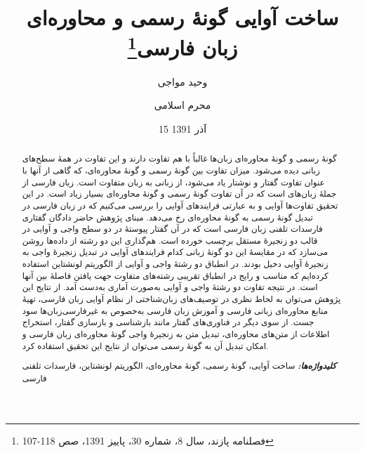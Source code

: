 \documentclass[12pt,onecolumn,a4paper]{article}
\providecommand{\keywords}[1]{\textbf{\textit{کلیدواژه‌ها:}} #1}
\begin{document}
    \title{ساخت آوایی گونهٔ رسمی و محاوره‌ای زبان فارسی\footnote{فصلنامه پازند، سال 8، شماره 30، پاییز 1391، صص 118-107}}
    \author[1]{وحید مواجی}
    \author[2]{محرم اسلامی}
    \date{15 آذر 1391}
    \maketitle

    \begin{abstract}
        گونهٔ رسمی و گونهٔ محاوره‌ای زبان‌ها غالباً با هم تفاوت‌ دارند و این تفاوت در همهٔ سطح‌های زبانی دیده می‌شود. میزان تفاوت بین گونهٔ رسمی و گونهٔ محاوره‌ای، که گاهی از آنها با عنوان تفاوت گفتار و نوشتار یاد می‌شود، از زبانی به زبان متفاوت است. زبان فارسی از جملهٔ زبان‌های است که در آن تفاوت گونهٔ رسمی و گونهٔ محاوره‌ای بسیار زیاد است. در این تحقیق تفاوت‌ها آوایی و به عبارتی فرایندهای آوایی را بررسی می‌کنیم که در زبان فارسی در تبدیل گونهٔ رسمی به گونهٔ محاوره‌ای رخ می‌دهد. مبنای پژوهش حاضر دادگان گفتاری فارسدات تلفنی زبان فارسی است که در آن گفتار پیوستهٔ در دو سطح واجی و آوایی در قالب دو زنجیرهٔ مستقل برچسب خورده است. هم‌گذاری این دو رشته از داده‌ها روشن می‌سازد که در مقایسهٔ این دو گونهٔ زبانی کدام فرایندهای آوایی در تبدیل زنجیرهٔ واجی به زنجیرهٔ آوایی دخیل بودند. در انطباق دو رشتهٔ واجی و آوایی از الگوریتم لونشتاین استفاده کرده‌ایم که مناسب و رایج در انطباق تقریبی رشته‌های متفاوت جهت یافتن فاصلهٔ بین آنها است. در نتیجه تفاوت دو رشتهٔ واجی و آوایی به‌صورت آماری به‌دست آمد. از نتایج این پژوهش می‌توان به لحاظ نظری در توصیف‌های زبان‌شناختی از نظام آوایی زبان فارسی، تهیهٔ منابع محاوره‌ای زبانی فارسی و آموزش زبان فارسی به‌خصوص به غیرفارسی‌زبان‌ها سود جست. از سوی دیگر در فناوری‌های گفتار مانند بازشناسی و بازسازی گفتار، استخراج اطلاعات از متن‌های محاوره‌ای، تبدیل متن به زنجیرهٔ واجی گونهٔ محاوره‌ای زبان فارسی و امکان تبدیل آن به گونهٔ رسمی می‌توان از نتایج این تحقیق استفاده کرد.
        \par
        \keywords{ساخت آوایی، گونهٔ رسمی، گونهٔ محاوره‌ای، الگوریتم لونشتاین، فارسدات تلفنی فارسی}
    \end{abstract}
\end{document}
